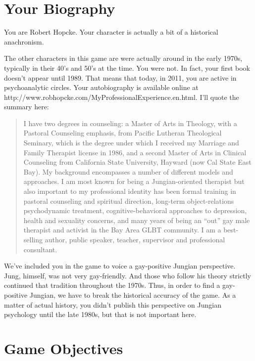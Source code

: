 \begin{refsection}
\section{Your Biography}
\label{yourbiography}

You are Robert Hopcke. Your character is actually a bit of a historical anachronism. 

The other characters in this game are were actually around in the early 1970s, typically in their 40's and 50's at the time. You were not. In fact, your first book doesn't appear until 1989. That means that today, in 2011, you are active in psychoanalytic circles. Your autobiography is available online at http:\slash \slash www.robhopcke.com\slash MyProfessionalExperience.en.html. I'll quote the summary here:

\begin{quote}

I have two degrees in counseling: a Master of Arts in Theology, with a Pastoral Counseling emphasis, from Pacific Lutheran Theological Seminary, which is the degree under which I received my Marriage and Family Therapist license in 1986, and a second Master of Arts in Clinical Counseling from California State University, Hayward (now Cal State East Bay). My background encompasses a number of different models and approaches. I am most known for being a Jungian-oriented therapist but also important to my professional identity has been formal training in pastoral counseling and spiritual direction, long-term object-relations psychodynamic treatment, cognitive-behavioral approaches to depression, health and sexuality concerns, and many years of being an ``out'' gay male therapist and activist in the Bay Area GLBT community. I am a best-selling author, public speaker, teacher, supervisor and professional consultant.
\end{quote}

We've included you in the game to voice a gay-positive Jungian perspective. Jung, himself, was not very gay-friendly. And those who follow his theory strictly continued that tradition throughout the 1970s. Thus, in order to find a gay-positive Jungian, we have to break the historical accuracy of the game. As a matter of actual history, you didn't publish this perspective on Jungian psychology until the late 1980s, but that is not important here.

\section{Game Objectives}
\label{gameobjectives}


\end{refsection}
